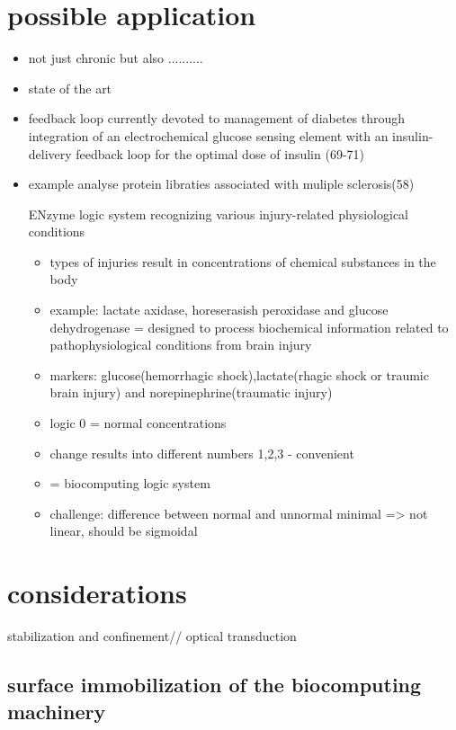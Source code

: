 \documentclass[runningheads]{llncs}
\begin{document}
\section{possible application}
	\begin{itemize}
		\item not just chronic but also ..........
		\item state of the art
		\item feedback loop currently devoted to management of diabetes through integration of an electrochemical glucose sensing element with an insulin-delivery feedback loop for the optimal dose of insulin (69-71)
		\item example analyse protein libraties associated with muliple sclerosis(58)
		
		ENzyme logic system recognizing various injury-related physiological conditions
		\begin{itemize}
			\item types of injuries result in concentrations of chemical substances in the body
			\\	
			\item example: lactate axidase, horeserasish peroxidase and glucose dehydrogenase = designed to process biochemical information related to pathophysiological conditions from brain injury
			\item markers: glucose(hemorrhagic shock),lactate(rhagic shock or traumic brain injury) and norepinephrine(traumatic injury)
			\item logic 0 = normal concentrations
			\item change results into different numbers 1,2,3 - convenient
			\item = biocomputing logic system 
			\item challenge: difference between normal and unnormal minimal => not linear, should be sigmoidal	
		\end{itemize}
	\end{itemize}



\section{considerations}
stabilization and confinement//
optical transduction 
\subsection{surface immobilization of the biocomputing machinery}
	
\end{document}
